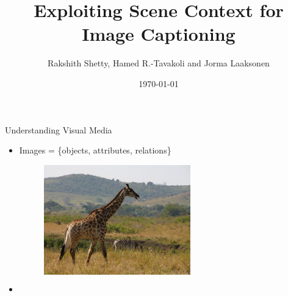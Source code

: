 \documentclass{beamer}
\begin{document}

\title{Exploiting Scene Context for Image Captioning}
\author[Rakshith Shetty and Jorma Laaksonen]{Rakshith Shetty, Hamed R.\@-Tavakoli and Jorma Laaksonen}
\date{\today}

\frame{\titlepage} 



\begin{frame}{Understanding Visual Media}
  \begin{itemize}
  \item<1-> Images = \{objects, attributes, relations\}\\
  \begin{figure}[h]
    \begin{columns}
    \hfill\includegraphics[width=0.6\textwidth]{images/COCO_train2014_000000544856.jpg}
    \hspace{-5mm}
    \centering
    \caption{}
    \end{columns}
  \end{figure}
  \item<2->
  \end{itemize}
\end{frame}
\end{document}
